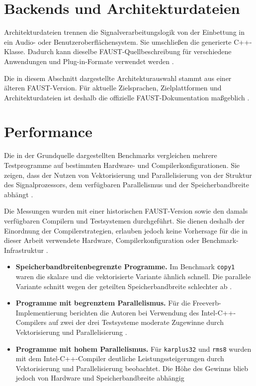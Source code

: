 \section{Backends und Architekturdateien}
Architekturdateien trennen die Signalverarbeitungslogik von der Einbettung in ein Audio- oder Benutzeroberflächensystem. Sie umschließen die generierte C++-Klasse. Dadurch kann dieselbe FAUST-Quellbeschreibung für verschiedene Anwendungen und Plug-in-Formate verwendet werden \parencite[S.~8]{orlarey:hal-02159014}.

Die in diesem Abschnitt dargestellte Architekturauswahl stammt aus einer älteren FAUST-Version. Für aktuelle Zielsprachen, Zielplattformen und Architekturdateien ist deshalb die offizielle FAUST-Dokumentation maßgeblich \parencite{faust_manual}.

\section{Performance}


Die in der Grundquelle dargestellten Benchmarks vergleichen mehrere Testprogramme auf bestimmten Hardware- und Compilerkonfigurationen. Sie zeigen, dass der Nutzen von Vektorisierung und Parallelisierung von der Struktur des Signalprozessors, dem verfügbaren Parallelismus und der Speicherbandbreite abhängt \parencite[S.~22--28]{orlarey:hal-02159014}.

Die Messungen wurden mit einer historischen FAUST-Version sowie den damals verfügbaren Compilern und Testsystemen durchgeführt. Sie dienen deshalb der Einordnung der Compilerstrategien, erlauben jedoch keine Vorhersage für die in dieser Arbeit verwendete Hardware, Compilerkonfiguration oder Benchmark-Infrastruktur \parencite[S.~22--23]{orlarey:hal-02159014}.

\begin{itemize}
	\item \textbf{Speicherbandbreitenbegrenzte Programme.} Im Benchmark \texttt{copy1} waren die skalare und die vektorisierte Variante ähnlich schnell. Die parallele Variante schnitt wegen der geteilten Speicherbandbreite schlechter ab \parencite[S.~22--23]{orlarey:hal-02159014}.

	\item \textbf{Programme mit begrenztem Parallelismus.} Für die Freeverb-Implementierung berichten die Autoren bei Verwendung des Intel-C++-Compilers auf zwei der drei Testsysteme moderate Zugewinne durch Vektorisierung und Parallelisierung \parencite[S.~24]{orlarey:hal-02159014}.
	
	\item \textbf{Programme mit hohem Parallelismus.} Für \texttt{karplus32} und \texttt{rms8} wurden mit dem Intel-C++-Compiler deutliche Leistungssteigerungen durch Vektorisierung und Parallelisierung beobachtet. Die Höhe des Gewinns blieb jedoch von Hardware und Speicherbandbreite abhängig \parencite[S.~24, S.~27--28]{orlarey:hal-02159014}
\end{itemize}

